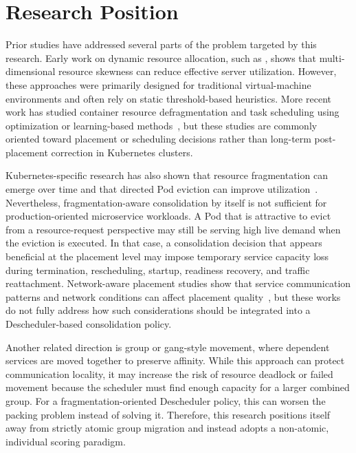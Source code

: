 \section{Research Position}
\label{sec:researchPosition}

Prior studies have addressed several parts of the problem targeted by this research. Early work on dynamic resource allocation, such as \citet{xiao2013dynamic}, shows that multi-dimensional resource skewness can reduce effective server utilization. However, these approaches were primarily designed for traditional virtual-machine environments and often rely on static threshold-based heuristics. More recent work has studied container resource defragmentation and task scheduling using optimization or learning-based methods~\citep{guo2025joint,bagaa2024multiobjective}, but these studies are commonly oriented toward placement or scheduling decisions rather than long-term post-placement correction in Kubernetes clusters.

Kubernetes-specific research has also shown that resource fragmentation can emerge over time and that directed Pod eviction can improve utilization~\citep{larsson_klein_elmroth_2023}. Nevertheless, fragmentation-aware consolidation by itself is not sufficient for production-oriented microservice workloads. A Pod that is attractive to evict from a resource-request perspective may still be serving high live demand when the eviction is executed. In that case, a consolidation decision that appears beneficial at the placement level may impose temporary service capacity loss during termination, rescheduling, startup, readiness recovery, and traffic reattachment. Network-aware placement studies show that service communication patterns and network conditions can affect placement quality~\citep{marchese2022network,marchese_tomarchio_2022,chen2024trade}, but these works do not fully address how such considerations should be integrated into a Descheduler-based consolidation policy.

Another related direction is group or gang-style movement, where dependent services are moved together to preserve affinity. While this approach can protect communication locality, it may increase the risk of resource deadlock or failed movement because the scheduler must find enough capacity for a larger combined group. For a fragmentation-oriented Descheduler policy, this can worsen the packing problem instead of solving it. Therefore, this research positions itself away from strictly atomic group migration and instead adopts a non-atomic, individual scoring paradigm.

